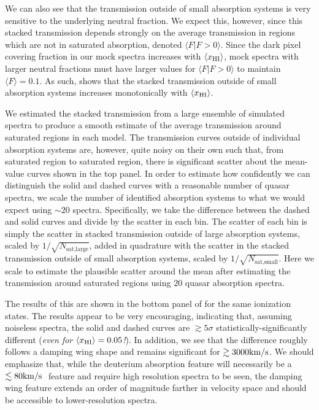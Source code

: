 We can also see that the transmission outside of small absorption systems is very sensitive to the underlying neutral fraction. We expect this, however, since this stacked transmission depends strongly on the average transmission in regions which are not in saturated absorption, denoted $\langle F | F > 0 \rangle$. Since the dark pixel covering fraction in our mock spectra increases with $\langle x_{\text{HI}}\rangle$, mock spectra with larger neutral fractions must have larger values for $\langle F | F > 0 \rangle$ to maintain $\langle F \rangle = 0.1$. As such,  shows that the stacked transmission outside of small absorption systems increases monotonically with $\langle x_{\text{HI}}\rangle$. 


We estimated the stacked transmission from a large ensemble of simulated spectra to produce a smooth estimate of the average transmission around saturated regions in each model.
The transmission curves outside of individual absorption systems are, however, quite noisy on their own such that, from saturated region to saturated region, there is significant scatter about the mean-value curves shown in the top panel. In order to estimate how confidently we can distinguish the solid and dashed curves with a reasonable number of quasar spectra, we scale the number of identified absorption systems to what we would expect using $\sim 20$ spectra. Specifically, we take the difference between the dashed and solid curves and divide by the scatter in each bin. The scatter of each bin is simply the scatter in stacked transmission outside of large absorption systems, scaled by $1/\sqrt{N_{\text{sat,large}}}$, added in quadrature with the scatter in the stacked transmission outside of small absorption systems, scaled by $1/\sqrt{N_{\text{sat,small}}}$.  Here we scale to estimate the plausible scatter around the mean after estimating the transmission around saturated regions using $20$ quasar absorption
spectra.


The results of this are shown in the bottom panel of  for the same ionization states. The results appear to be very encouraging, indicating that, assuming noiseless spectra, the solid and dashed curves are $\gtrsim 5\sigma$ statistically-significantly different (\textit{even for $\langle x_{\text{HI}}\rangle = 0.05$!}). In addition, we see that the difference roughly follows a damping wing shape and remains significant for $\gtrsim 3000\text{km}/\text{s}$. We should emphasize that, while the deuterium absorption feature will necessarily be a $\lesssim 80\text{km}/\text{s}\ $ feature and require high resolution spectra to be seen, the damping wing feature extends an order of magnitude farther in velocity space and should be accessible to lower-resolution spectra. 


